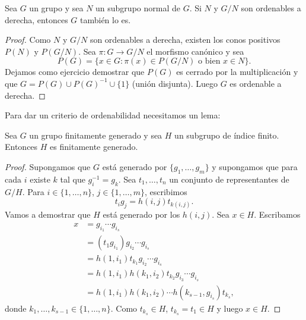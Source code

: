 \begin{lemma}
	Sea $G$ un grupo y sea $N$ un subgrupo normal de $G$.  Si $N$ y $G/N$ son
	ordenables a derecha, entonces $G$ también lo es. 
\end{lemma}
%
\begin{proof}
	Como $N$ y $G/N$ son ordenables a derecha, existen los conos positivos
	$P(N)$ y $P(G/N)$. Sea $\pi\colon G\to G/N$ el morfismo canónico y sea
	\[
		P(G)=\{x\in G:\pi(x)\in P(G/N)\text{ o bien }x\in N\}.
	\]	
	Dejamos como ejercicio demostrar que $P(G)$ es cerrado por la
	multiplicación y que $G=P(G)\cup P(G)^{-1}\cup \{1\}$ (unión disjunta).
	Luego $G$ es ordenable a derecha. 
\end{proof}
%

Para dar un criterio de ordenabilidad necesitamos un lema:

\begin{lemma}
	\label{lemma:fg}
	Sea $G$ un grupo finitamente generado y sea $H$ un subgrupo de índice
	finito. Entonces $H$ es finitamente generado.
\end{lemma}

\begin{proof}
	Supongamos que $G$ está generado por $\{g_1,\dots,g_m\}$ y supongamos que
	para cada $i$ existe $k$ tal que $g_i^{-1}=g_k$. Sea $t_1,\dots,t_n$ un
	conjunto de representantes de $G/H$. Para $i\in\{1,\dots,n\}$,
	$j\in\{1,\dots,m\}$, escribimos
	\[
		t_ig_j=h(i,j)t_{k(i,j)}.
	\]
	Vamos a demostrar que $H$ está generado por los $h(i,j)$. Sea $x\in H$.
	Escribamos 
	\begin{align*}
	x &=g_{i_1}\cdots g_{i_s}\\
	&= (t_1g_{i_1})g_{i_2}\cdots g_{i_s}\\
	&= h(1,i_1)t_{k_1}g_{i_2}\cdots g_{i_s}\\
	&= h(1,i_1)h(k_1,i_2)t_{k_2}g_{i_3}\cdots g_{i_s}\\
	&= h(1,i_1)h(k_1,i_2)\cdots h(k_{s-1},g_{i_s})t_{k_s},
	\end{align*}
	donde $k_1,\dots,k_{s-1}\in\{1,\dots,n\}$. Como $t_{k_s}\in H$,
	$t_{k_s}=t_1\in H$ y luego $x\in H$.
\end{proof}

